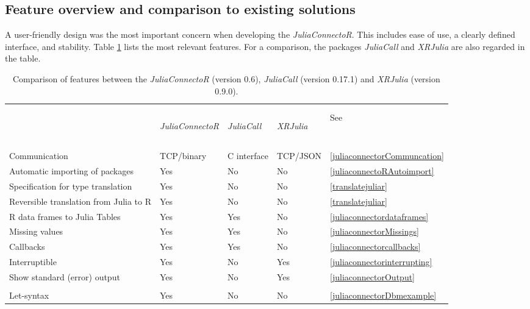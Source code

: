 \documentclass[12pt]{article}
\newcommand{\apkg}[1]{\emph{#1}}
\newcommand{\proglang}[1]{#1} %
\begin{document}
\subsection{Feature overview and comparison to existing solutions}
A user-friendly design was the most important concern when developing the \apkg{JuliaConnectoR}.
This includes ease of use, a clearly defined interface, and stability.
Table \ref{tab:JuliaConnectoRFeatures} lists the most relevant features.
For a comparison, the packages \apkg{JuliaCall} and \apkg{XRJulia} are also regarded in the table.

\begin{table}[h!]
\centering
\caption{\label{tab:JuliaConnectoRFeatures} Comparison of features between the
\apkg{JuliaConnectoR} (version 0.6), \apkg{JuliaCall} (version 0.17.1) and
\apkg{XRJulia} (version 0.9.0).}
\begin{tabular}{p{6.75cm} p{1.9cm} p{2.05cm} p{2cm} p{1.2cm}}
\hline \\ [2ex]\\
 & \begin{rotate}{25}\apkg{JuliaConnectoR} \end{rotate} &
 \begin{rotate}{25} \apkg{JuliaCall} \end{rotate} &
 \begin{rotate}{25} \apkg{XRJulia} \end{rotate} &
 See \\
\hline 
\\\\[-4\medskipamount]
Communication & TCP/binary & \proglang{C} interface & TCP/JSON &
\ref{juliaconnectorCommuncation} \\
Automatic importing of packages & Yes & No & No &
\ref{juliaconnectoRAutoimport} \\
Specification for type translation & Yes & No & No &
\ref{translatejuliar} \\
Reversible translation from Julia to R & Yes
& No & No & \ref{translatejuliar} \\
\proglang{R} data frames to \proglang{Julia} Tables & Yes & Yes & No &
\ref{juliaconnectordataframes} \\
Missing values & Yes & Yes & No & \ref{juliaconnectorMissings} \\
Callbacks & Yes & Yes & No & \ref{juliaconnectorcallbacks} \\
Interruptible & Yes & No & Yes & \ref{juliaconnectorinterrupting} \\
Show standard (error) output & Yes & No & Yes &
\ref{juliaconnectorOutput} \\
\\[-2\medskipamount]
Let-syntax & Yes & No & No & \ref{juliaconnectorDbmexample} \\
\hline
\end{tabular}
\end{table}
\end{document}

